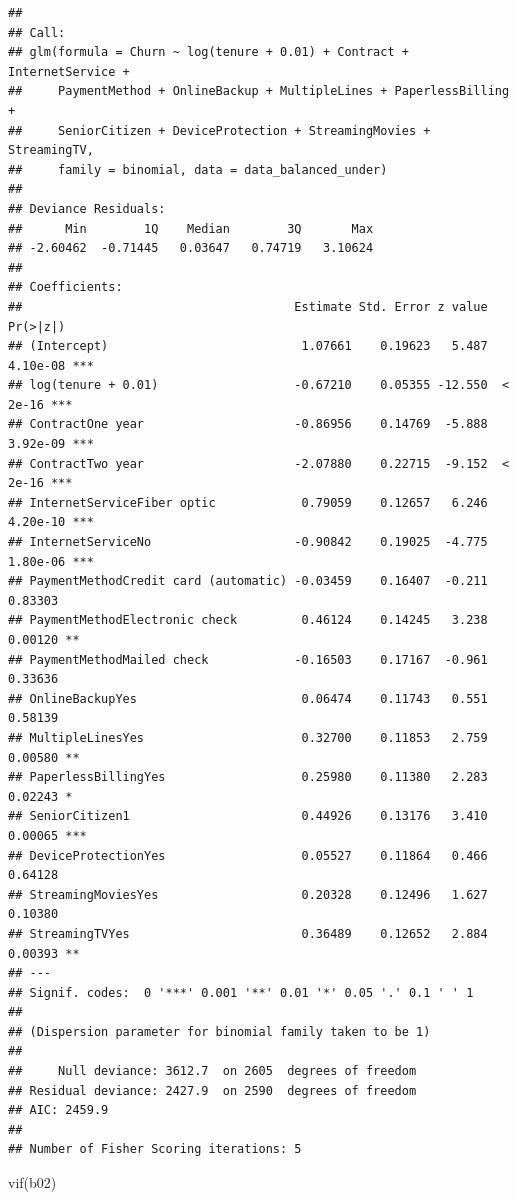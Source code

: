 \documentclass[
  twoside]{article}
\newenvironment{Shaded}{\begin{snugshade}}{\end{snugshade}}
\newcommand{\FunctionTok}[1]{\textcolor[rgb]{0.00,0.00,0.00}{#1}}
\newcommand{\NormalTok}[1]{#1}
\begin{document}
\begin{verbatim}
## 
## Call:
## glm(formula = Churn ~ log(tenure + 0.01) + Contract + InternetService + 
##     PaymentMethod + OnlineBackup + MultipleLines + PaperlessBilling + 
##     SeniorCitizen + DeviceProtection + StreamingMovies + StreamingTV, 
##     family = binomial, data = data_balanced_under)
## 
## Deviance Residuals: 
##      Min        1Q    Median        3Q       Max  
## -2.60462  -0.71445   0.03647   0.74719   3.10624  
## 
## Coefficients:
##                                      Estimate Std. Error z value Pr(>|z|)    
## (Intercept)                           1.07661    0.19623   5.487 4.10e-08 ***
## log(tenure + 0.01)                   -0.67210    0.05355 -12.550  < 2e-16 ***
## ContractOne year                     -0.86956    0.14769  -5.888 3.92e-09 ***
## ContractTwo year                     -2.07880    0.22715  -9.152  < 2e-16 ***
## InternetServiceFiber optic            0.79059    0.12657   6.246 4.20e-10 ***
## InternetServiceNo                    -0.90842    0.19025  -4.775 1.80e-06 ***
## PaymentMethodCredit card (automatic) -0.03459    0.16407  -0.211  0.83303    
## PaymentMethodElectronic check         0.46124    0.14245   3.238  0.00120 ** 
## PaymentMethodMailed check            -0.16503    0.17167  -0.961  0.33636    
## OnlineBackupYes                       0.06474    0.11743   0.551  0.58139    
## MultipleLinesYes                      0.32700    0.11853   2.759  0.00580 ** 
## PaperlessBillingYes                   0.25980    0.11380   2.283  0.02243 *  
## SeniorCitizen1                        0.44926    0.13176   3.410  0.00065 ***
## DeviceProtectionYes                   0.05527    0.11864   0.466  0.64128    
## StreamingMoviesYes                    0.20328    0.12496   1.627  0.10380    
## StreamingTVYes                        0.36489    0.12652   2.884  0.00393 ** 
## ---
## Signif. codes:  0 '***' 0.001 '**' 0.01 '*' 0.05 '.' 0.1 ' ' 1
## 
## (Dispersion parameter for binomial family taken to be 1)
## 
##     Null deviance: 3612.7  on 2605  degrees of freedom
## Residual deviance: 2427.9  on 2590  degrees of freedom
## AIC: 2459.9
## 
## Number of Fisher Scoring iterations: 5
\end{verbatim}

\begin{Shaded}
\begin{Highlighting}[]
\FunctionTok{vif}\NormalTok{(b02)}
\end{Highlighting}
\end{Shaded}
\end{document}
